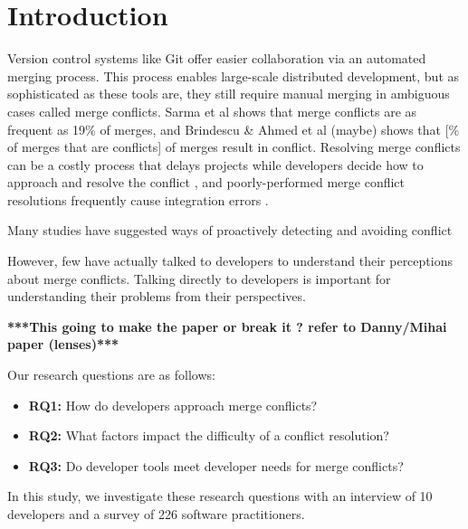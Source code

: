 \section{Introduction}\label{introduction}



Version control systems like Git offer easier collaboration via an automated merging process. This process enables large-scale distributed development, but as sophisticated as these tools are, they still require manual merging in ambiguous cases called merge conflicts. Sarma et al \cite{cassandra} shows that merge conflicts are as frequent as 19\% of merges, and Brindescu \& Ahmed et al (maybe) shows that [\% of merges that are conflicts] of merges result in conflict. Resolving merge conflicts can be a costly process that delays projects while developers decide how to approach and resolve the conflict \cite{cassandra}, and poorly-performed merge conflict resolutions frequently cause integration errors \cite{bird-branches-conflict}. 


Many studies have suggested ways of proactively detecting and avoiding conflict \cite{Brun2011} \cite{palantir} 


However, few have actually talked to developers to understand their perceptions about merge conflicts. Talking directly to developers is important for understanding their problems from their perspectives.

\textbf{***This going to make the paper or break it ? refer to Danny/Mihai paper (lenses)***}

Our research questions are as follows:
\begin{itemize}
\item\textbf{RQ1:} How do developers approach merge conflicts?\\
\item\textbf{RQ2:} What factors impact the difficulty of a conflict resolution?\\
\item\textbf{RQ3:} Do developer tools meet developer needs for merge conflicts?\\
\end{itemize}

In this study, we investigate these research questions with an interview of 10 developers and a survey of 226 software practitioners.